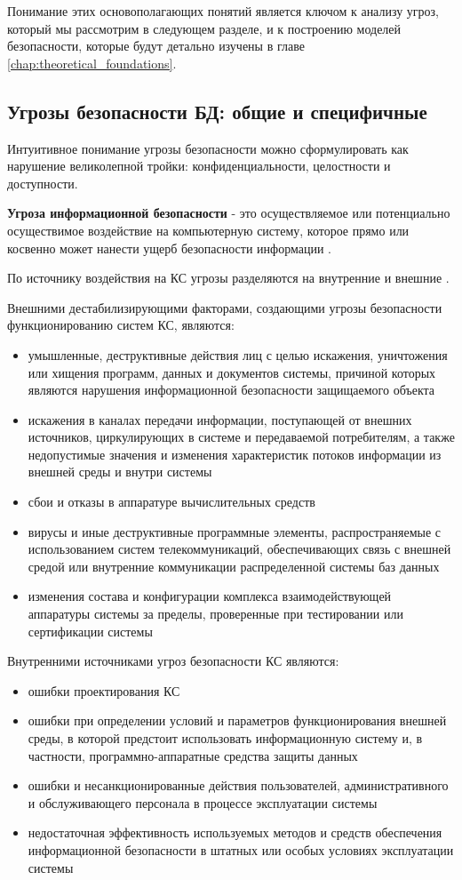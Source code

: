Понимание этих основополагающих понятий является ключом к анализу угроз, который мы рассмотрим в следующем разделе, и к построению моделей безопасности, которые будут детально изучены в главе \ref{chap:theoretical_foundations}.

\subsection{Угрозы безопасности БД: общие и специфичные}
Интуитивное понимание угрозы безопасности можно сформулировать как нарушение великолепной тройки: конфиденциальности, целостности и доступности. 
\begin{grayquote}
\textbf{Угроза информационной безопасности} - это осуществляемое или потенциально осуществимое воздействие на компьютерную систему, которое прямо или косвенно может нанести ущерб безопасности информации \autocite[с. 19]{Skakun}.
\end{grayquote}
По источнику воздействия на КС угрозы разделяются на внутренние и внешние \autocite{Ytebov2008}.

Внешними дестабилизирующими факторами, создающими угрозы безопасности функционированию систем КС, являются:
\begin{itemize}
	\item умышленные, деструктивные действия лиц с целью искажения, уничтожения или хищения программ, данных и документов системы, причиной которых являются нарушения информационной безопасности защищаемого объекта
	\item искажения в каналах передачи информации, поступающей от внешних источников, циркулирующих в системе и передаваемой потребителям, а также недопустимые значения и изменения характеристик потоков информации из внешней среды и внутри системы~\label{pon:pot}
	\item сбои и отказы в аппаратуре вычислительных средств
	\item вирусы и иные деструктивные программные элементы, распространяемые с использованием систем телекоммуникаций, обеспечивающих связь с внешней средой или внутренние коммуникации распределенной системы баз данных
	\item изменения состава и конфигурации комплекса взаимодействующей аппаратуры системы за пределы, проверенные при тестировании или сертификации системы
\end{itemize}

Внутренними источниками угроз безопасности КС являются:
\begin{itemize}
	\item ошибки проектирования КС
	\item ошибки при определении условий и параметров функционирования внешней среды, в которой предстоит использовать информационную систему и, в частности, программно-аппаратные средства защиты данных
	\item ошибки и несанкционированные действия пользователей, административного и обслуживающего персонала в процессе эксплуатации системы
	\item недостаточная эффективность используемых методов и средств обеспечения информационной безопасности в штатных или особых условиях эксплуатации системы
\end{itemize}

